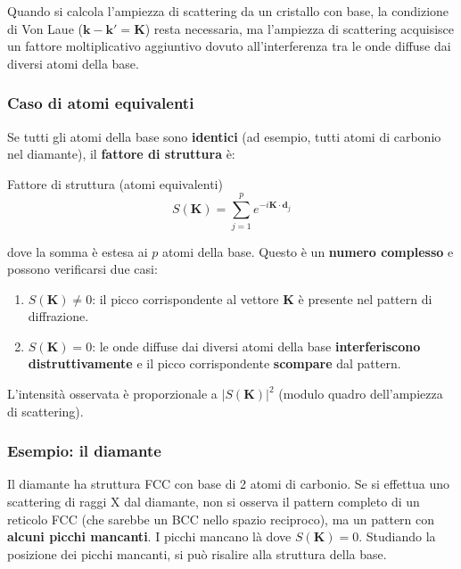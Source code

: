 Quando si calcola l'ampiezza di scattering da un cristallo con base, la condizione di Von Laue ($\mathbf{k} - \mathbf{k}' = \mathbf{K}$) resta necessaria, ma l'ampiezza di scattering acquisisce un fattore moltiplicativo aggiuntivo dovuto all'interferenza tra le onde diffuse dai diversi atomi della base.

\subsubsection*{Caso di atomi equivalenti}

Se tutti gli atomi della base sono \textbf{identici} (ad esempio, tutti atomi di carbonio nel diamante), il \textbf{fattore di struttura} è:

\begin{equazione}{Fattore di struttura (atomi equivalenti)}
\begin{equation}
S(\mathbf{K}) = \sum_{j=1}^{p} e^{-i\mathbf{K}\cdot\mathbf{d}_j}
\end{equation}
\end{equazione}

dove la somma è estesa ai $p$ atomi della base. Questo è un \textbf{numero complesso} e possono verificarsi due casi:

\begin{enumerate}
    \item \textbf{$S(\mathbf{K}) \neq 0$}: il picco corrispondente al vettore $\mathbf{K}$ è presente nel pattern di diffrazione.
    \item \textbf{$S(\mathbf{K}) = 0$}: le onde diffuse dai diversi atomi della base \textbf{interferiscono distruttivamente} e il picco corrispondente \textbf{scompare} dal pattern.
\end{enumerate}

L'intensità osservata è proporzionale a $|S(\mathbf{K})|^2$ (modulo quadro dell'ampiezza di scattering).

\subsubsection*{Esempio: il diamante}

Il diamante ha struttura FCC con base di 2 atomi di carbonio. Se si effettua uno scattering di raggi X dal diamante, non si osserva il pattern completo di un reticolo FCC (che sarebbe un BCC nello spazio reciproco), ma un pattern con \textbf{alcuni picchi mancanti}. I picchi mancano là dove $S(\mathbf{K}) = 0$. Studiando la posizione dei picchi mancanti, si può risalire alla struttura della base.

